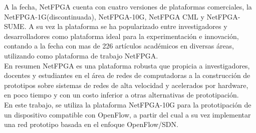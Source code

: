 A la fecha, NetFPGA cuenta con cuatro versiones de plataformas comerciales, la NetFPGA-1G(discontinuada), NetFPGA-10G, NetFPGA CML y NetFPGA-SUME. A su vez la plataforma se ha popularizado entre investigadores y desarrolladores como plataforma ideal para la experimentación e innovación, contando a la fecha con mas de 226 artículos académicos\cite{NetFPGA4} en diversas áreas, utilizando como plataforma de trabajo NetFPGA.\\

En resumen NetFPGA es una plataforma robusta que propicia a investigadores, docentes y estudiantes en el área de redes de computadoras a la construcción de prototipos sobre sistemas de redes de alta velocidad y acelerados por hardware, en poco tiempo y con un costo inferior a otras alternativas de prototipaci\'on.\\

En este trabajo, se utiliza la plataforma NetFPGA-10G para la prototipaci\'on de un dispositivo compatible con OpenFlow, a partir del cual a su vez implementar una red prototipo basada en el enfoque OpenFlow/SDN. 

